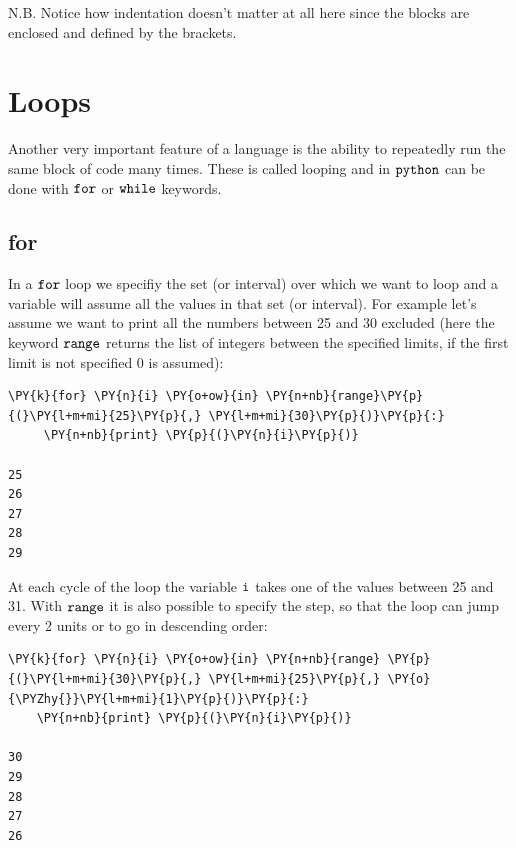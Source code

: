 N.B. Notice how indentation doesn't matter at all here since the blocks are enclosed and defined by the brackets.

\section{Loops}\label{loops}

Another very important feature of a language is the ability to repeatedly run the same block of code many times. These is called looping and in \(\tt{python}\) can be done with $\tt{for}$ or $\tt{while}$ keywords.

\subsection{for}\label{for}

In a $\tt{for}$ loop we specifiy the set (or interval) over which we want to loop and a variable will assume all the values in that set (or interval). For example let's assume we want to print all the numbers between 25 and 30 excluded (here the keyword $\tt{range}$ returns the list of integers between the specified limits, if the first limit is not specified 0 is assumed):

\begin{tcolorbox}[breakable, size=fbox, boxrule=1pt, pad at break*=1mm, colback=cellbackground, colframe=cellborder]            
\begin{Verbatim}[commandchars=\\\{\}]
\PY{k}{for} \PY{n}{i} \PY{o+ow}{in} \PY{n+nb}{range}\PY{p}{(}\PY{l+m+mi}{25}\PY{p}{,} \PY{l+m+mi}{30}\PY{p}{)}\PY{p}{:}
     \PY{n+nb}{print} \PY{p}{(}\PY{n}{i}\PY{p}{)}

25
26
27
28
29
\end{Verbatim}
\end{tcolorbox}

At each cycle of the loop the variable $\tt{i}$ takes one of the values between
25 and 31. With $\tt{range}$ it is also possible to specify the step, so that the loop can jump every 2 units or to go in descending order:

\begin{tcolorbox}[breakable, size=fbox, boxrule=1pt, pad at break*=1mm, colback=cellbackground, colframe=cellborder]            
\begin{Verbatim}[commandchars=\\\{\}]
\PY{k}{for} \PY{n}{i} \PY{o+ow}{in} \PY{n+nb}{range} \PY{p}{(}\PY{l+m+mi}{30}\PY{p}{,} \PY{l+m+mi}{25}\PY{p}{,} \PY{o}{\PYZhy{}}\PY{l+m+mi}{1}\PY{p}{)}\PY{p}{:}
    \PY{n+nb}{print} \PY{p}{(}\PY{n}{i}\PY{p}{)}

30
29
28
27
26
\end{Verbatim}
\end{tcolorbox}


